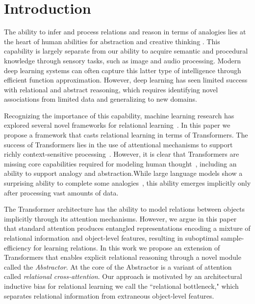 \section{Introduction}

The ability to infer and process relations and reason in terms of analogies lies at the heart of human abilities for abstraction and creative thinking
\citep{snow,holyoak}. This capability is largely separate from our ability to acquire semantic and procedural knowledge through sensory tasks, such as image and audio processing. Modern deep learning systems can often capture this latter type of intelligence through efficient function approximation. However, deep learning has seen limited success with relational and abstract reasoning, which requires identifying novel associations from limited data and generalizing to new domains.

Recognizing the importance of this capability, machine learning research has explored several novel frameworks for relational learning~\citep{TEM, NTM,episodicControl,shanahanExplicitlyRelationalNeural,esbn,mondal23learned,battaglia,barrett:2018,santoro1}. In this paper we propose a framework that casts relational learning in terms of Transformers. The success of Transformers lies in the use of attentional mechanisms to support richly context-sensitive processing~\citep{vaswani2017attention,transformers,kerg2020untangling}. However, it is clear that Transformers are missing core capabilities required for modeling human thought~\citep{mahowald2023dissociating}, including an ability to support analogy and abstraction.While large language models show a surprising ability to complete some analogies~\citep{webb}, this ability emerges implicitly only after processing vast amounts of data.

The Transformer architecture has the ability to model relations between objects implicitly through its attention mechanisms. However, we argue in this paper that standard attention produces entangled representations encoding a mixture of relational information and object-level features, resulting in suboptimal sample-efficiency for learning relations.
In this work we propose an extension of Transformers that enables explicit relational reasoning through a novel module called the \textit{Abstractor}. At the core of the Abstractor is a variant of attention called \textit{relational cross-attention}. Our approach is motivated by an architectural inductive bias for relational learning we call the ``relational bottleneck," which separates relational information from extraneous object-level features.

